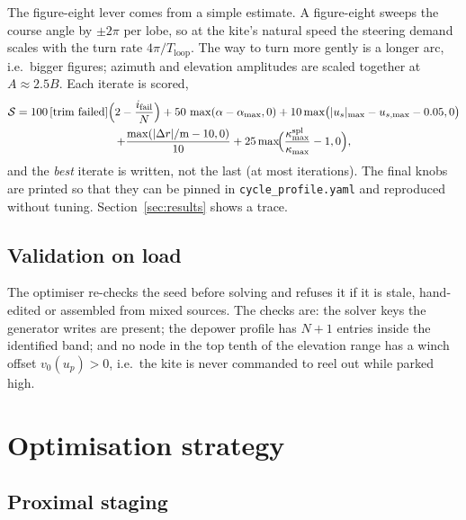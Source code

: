 \documentclass[11pt,a4paper]{article}
\newcommand{\code}[1]{\texttt{\small #1}}
\begin{document}
The figure-eight lever comes from a simple estimate. A figure-eight sweeps the
course angle by $\pm2\pi$ per lobe, so at the kite's natural speed the steering
demand scales with the turn rate $4\pi/T_\mathrm{loop}$. The way to turn more
gently is a longer arc, i.e.\ bigger figures; azimuth and elevation amplitudes
are scaled together at $A\approx2.5B$. Each iterate is scored,
\begin{multline}
  \mathcal S = 100\,[\text{trim failed}]\Bigl(2-\frac{i_\mathrm{fail}}{N}\Bigr)
  + 50\,\max(\alpha-\alpha_{\max},0)
  + 10\max\bigl(|u_s|_{\max}-u_{s,\max}-\num{0.05},0\bigr) \\
  + \frac{\max(|\Delta r|/\mathrm{m}-10,0)}{10}
  + 25\max\!\Bigl(\frac{\kappa_{\max}^\mathrm{spl}}{\kappa_{\max}}-1,0\Bigr),
\end{multline}
and the \emph{best} iterate is written, not the last (at most
\autoMaxIter{} iterations). The final knobs are printed so that they can be
pinned in \code{cycle\_profile.yaml} and reproduced without tuning.
Section~\ref{sec:results} shows a trace.

\subsection{Validation on load}

The optimiser re-checks the seed before solving and refuses it if it is
stale, hand-edited or assembled from mixed sources. The checks are: the
solver keys the generator writes are present; the depower profile has
$N+1$ entries inside the identified band; and no node in the top tenth of
the elevation range has a winch offset $v_0(u_p)>0$, i.e.\ the kite is never
commanded to reel out while parked high.

\section{Optimisation strategy}
\label{sec:opt}

\subsection{Proximal staging}
\label{sec:staging}
\end{document}
